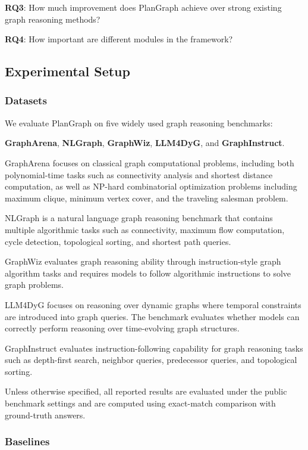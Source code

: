 \documentclass[sigconf,review,anonymous]{acmart}
\begin{document}
\textbf{RQ3}: How much improvement does PlanGraph achieve over
strong existing graph reasoning methods?

\textbf{RQ4}: How important are different modules in the framework?


\subsection{Experimental Setup}

\subsubsection{Datasets}

We evaluate PlanGraph on five widely used graph reasoning benchmarks:

\textbf{GraphArena}, \textbf{NLGraph}, \textbf{GraphWiz},
\textbf{LLM4DyG}, and \textbf{GraphInstruct}.

GraphArena focuses on classical graph computational problems,
including both polynomial-time tasks such as connectivity
analysis and shortest distance computation, as well as
NP-hard combinatorial optimization problems including
maximum clique, minimum vertex cover, and the traveling
salesman problem.

NLGraph is a natural language graph reasoning benchmark
that contains multiple algorithmic tasks such as connectivity,
maximum flow computation, cycle detection, topological sorting,
and shortest path queries.

GraphWiz evaluates graph reasoning ability through
instruction-style graph algorithm tasks and requires models
to follow algorithmic instructions to solve graph problems.

LLM4DyG focuses on reasoning over dynamic graphs where
temporal constraints are introduced into graph queries.
The benchmark evaluates whether models can correctly
perform reasoning over time-evolving graph structures.

GraphInstruct evaluates instruction-following capability
for graph reasoning tasks such as depth-first search,
neighbor queries, predecessor queries, and topological
sorting.

Unless otherwise specified, all reported results are evaluated
under the public benchmark settings and are computed using
exact-match comparison with ground-truth answers.


\subsubsection{Baselines}
\end{document}
